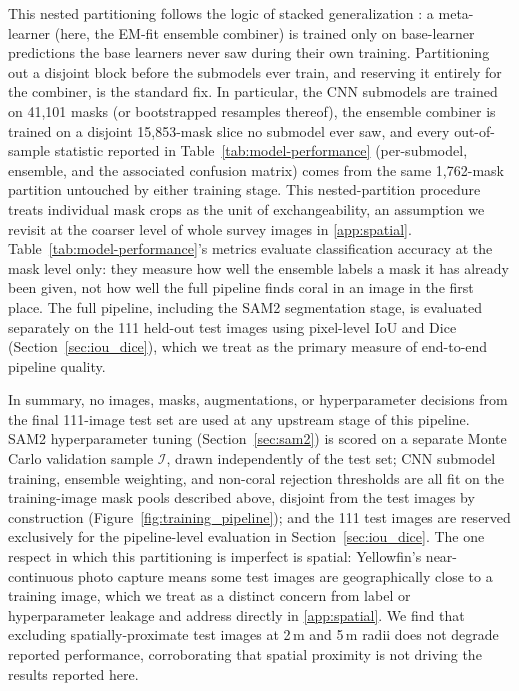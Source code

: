 \documentclass[11pt]{elsarticle}
\begin{document}
This nested partitioning follows the logic of stacked generalization \citep{wolpert1992stacked}: a meta-learner (here, the EM-fit ensemble combiner) is trained only on base-learner predictions the base learners never saw during their own training. Partitioning out a disjoint block before the submodels ever train, and reserving it entirely for the combiner, is the standard fix. In particular, the CNN submodels are trained on 41,101 masks (or bootstrapped resamples thereof), the ensemble combiner is trained on a disjoint 15,853-mask slice no submodel ever saw, and every out-of-sample statistic reported in Table~\ref{tab:model-performance} (per-submodel, ensemble, and the associated confusion matrix) comes from the same 1,762-mask partition untouched by either training stage. This nested-partition procedure treats individual mask crops as the unit of exchangeability, an assumption we revisit at the coarser level of whole survey images in \ref{app:spatial}. Table~\ref{tab:model-performance}'s metrics evaluate classification accuracy at the mask level only: they measure how well the ensemble labels a mask it has already been given, not how well the full pipeline finds coral in an image in the first place. The full pipeline, including the SAM2 segmentation stage, is evaluated separately on the 111 held-out test images using pixel-level IoU and Dice (Section~\ref{sec:iou_dice}), which we treat as the primary measure of end-to-end pipeline quality.

In summary, no images, masks, augmentations, or hyperparameter decisions from the final 111-image test set are used at any upstream stage of this pipeline. SAM2 hyperparameter tuning (Section~\ref{sec:sam2}) is scored on a separate Monte Carlo validation sample $\mathcal{I}$, drawn independently of the test set; CNN submodel training, ensemble weighting, and non-coral rejection thresholds are all fit on the training-image mask pools described above, disjoint from the test images by construction (Figure~\ref{fig:training_pipeline}); and the 111 test images are reserved exclusively for the pipeline-level evaluation in Section~\ref{sec:iou_dice}. The one respect in which this partitioning is imperfect is spatial: Yellowfin's near-continuous photo capture means some test images are geographically close to a training image, which we treat as a distinct concern from label or hyperparameter leakage and address directly in \ref{app:spatial}. We find that excluding spatially-proximate test images at 2\,m and 5\,m radii does not degrade reported performance, corroborating that spatial proximity is not driving the results reported here.
\end{document}
